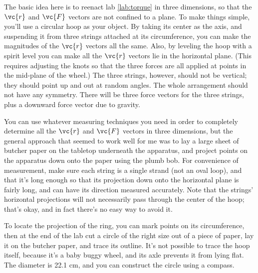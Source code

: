 \label{lab:torque-in-three-dimensions}

\apparatus
{}



\observations

The basic idea here is to reenact lab \ref{lab:torque} in three dimensions, so that the $\vc{r}$ and $\vc{F}$ vectors are not
confined to a plane. To make things simple, you'll use a circular hoop as your object. By taking its center as the axis, and suspending it
from three strings attached at its circumference, you can make the magnitudes of the $\vc{r}$ vectors all the same. Also, by leveling the
hoop with a spirit level you can make all the $\vc{r}$ vectors lie in the horizontal plane. (This requires adjusting the knots
so that the three forces are all applied at points in the mid-plane of the wheel.) The three strings, however, should not be
vertical; they should point up and out at random angles. The whole arrangement should not have any symmetry.
There will be three force vectors for the three strings, plus a downward force vector due to gravity.

You can use whatever measuring techniques you need in order to completely determine all the $\vc{r}$ and $\vc{F}$ vectors in three
dimensions, but the general approach that seemed to work well for me was to lay a large sheet of butcher paper on the tabletop underneath
the apparatus, and project points on the apparatus down onto the paper using the plumb bob.
For convenience of measurement, make sure each string is a single strand (not an oval loop), and that
it's long enough so that its projection down onto the horizontal plane is fairly long, and can have its direction measured accurately.
Note that the strings' horizontal projections will not necessarily pass through the center of the hoop; that's okay, and in fact
there's no easy way to avoid it.

To locate the projection of the ring, you can mark points on its circumference, then at the end of the lab cut a circle of the right
size out of a piece of paper, lay it on the butcher paper, and trace its outline. It's not possible to trace the hoop itself, because
it's a baby buggy wheel, and its axle prevents it from lying flat. The diameter is 22.1 cm, and you can construct the circle using
a compass.

